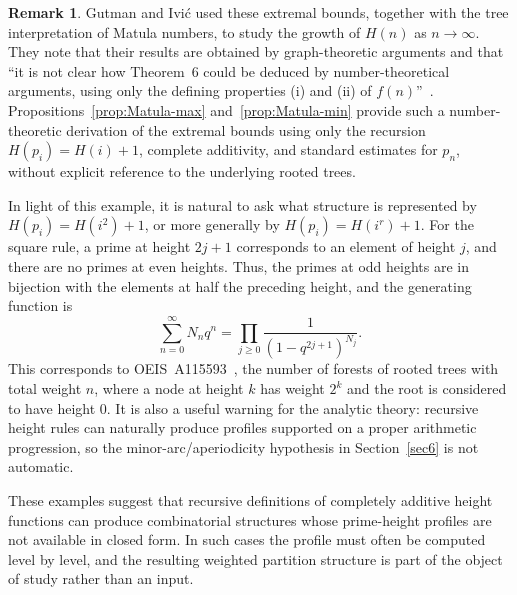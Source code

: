 \documentclass[11pt]{article}
\theoremstyle{definition}
\newtheorem{remark}{Remark}
\begin{document}
\begin{remark}
Gutman and Ivi\'c used these extremal bounds, together with the tree interpretation of Matula numbers, to study the growth of $H(n)$ as $n\to\infty$.  They note that their results are obtained by graph-theoretic arguments and that ``it is not clear how Theorem~6 could be deduced by number-theoretical arguments, using only the defining properties (i) and (ii) of $f(n)$''~\cite[p.~141]{gutman}.  Propositions~\ref{prop:Matula-max} and~\ref{prop:Matula-min} provide such a number-theoretic derivation of the extremal bounds using only the recursion $H(p_i)=H(i)+1$, complete additivity, and standard estimates for $p_n$, without explicit reference to the underlying rooted trees.
\end{remark}

In light of this example, it is natural to ask what structure is represented by
$H(p_i)=H(i^2)+1$, or more generally by $H(p_i)=H(i^r)+1$.  For the square rule,
a prime at height $2j+1$ corresponds to an element of height $j$, and there are
no primes at even heights.  Thus, the primes at odd heights are in bijection with
the elements at half the preceding height, and the generating function is
\[
  \sum_{n=0}^{\infty}N_nq^n
  =
  \prod_{j\ge0}\frac{1}{(1-q^{2j+1})^{N_j}}.
\]
This corresponds to OEIS~A115593~\cite{OEIS}, the number of forests of rooted trees with
total weight $n$, where a node at height $k$ has weight $2^k$ and the root is
considered to have height $0$.  It is also a useful warning for the analytic
theory: recursive height rules can naturally produce profiles supported on a
proper arithmetic progression, so the minor-arc/aperiodicity hypothesis in
Section~\ref{sec6} is not automatic.

These examples suggest that recursive definitions of completely additive height
functions can produce combinatorial structures whose prime-height profiles are
not available in closed form.  In such cases the profile must often be computed
level by level, and the resulting weighted partition structure is part of the
object of study rather than an input.
\end{document}
